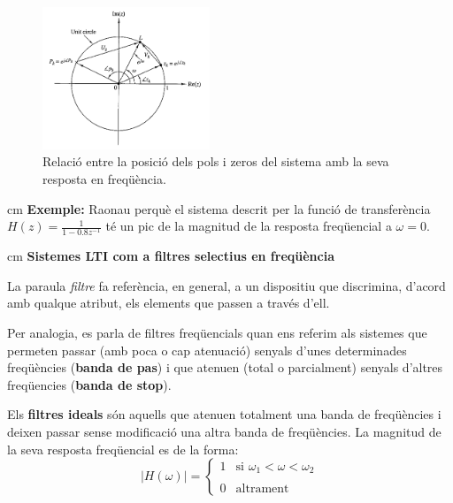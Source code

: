 \documentclass{article}
\begin{document}
\begin{figure}[htbp]
\begin{center}
\includegraphics[width=5cm]{polszerosHomega.png}
\end{center}
\caption{Relació entre la posició dels pols i zeros del sistema amb la seva resposta en freqüència.}
\label{polszerosHomega}
\end{figure}

 cm
\noindent
\textbf{Exemple:} Raonau perquè el sistema descrit per la funció de transferència $H(z)=\frac{1}{1-0.8z^{-1}}$
té un pic de la magnitud de la resposta freqüencial a $\omega=0$.
 

 cm
\noindent
\textbf{\large Sistemes LTI com a filtres selectius en freqüència}

%
%
%


La paraula \textit{filtre} fa referència, en general, a un dispositiu
que discrimina, d'acord amb qualque atribut, els elements que passen
a través d'ell.

Per analogia, es parla de filtres freqüencials quan ens referim als sistemes
que permeten passar (amb poca o cap atenuació) senyals d'unes determinades freqüències
(\textbf{banda de pas})
i que atenuen (total o parcialment) senyals d'altres freqüencies (\textbf{banda de stop}).

Els \textbf{filtres ideals} són aquells que atenuen totalment una banda de freqüències
i deixen passar sense modificació una altra banda de freqüències. La magnitud 
de la seva resposta freqüencial es de la forma:
\[
|H(\omega)|=\begin{cases} 1 & \text{si } \omega_1 < \omega < \omega_2 \\ \\
0 & \text{altrament} \end{cases}
\]
\end{document}

